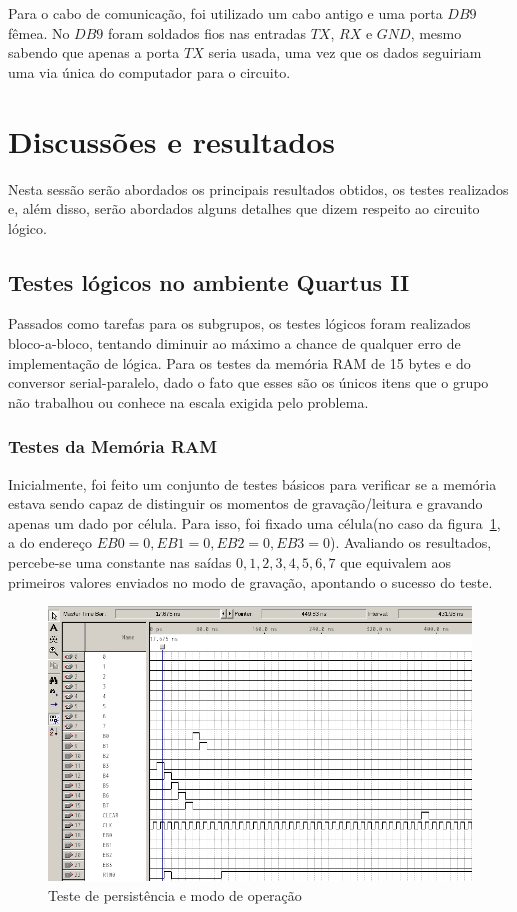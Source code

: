 \documentclass[12pt]{article}
\begin{document}
Para o cabo de comunicação, foi utilizado um cabo antigo e uma porta $DB9$ fêmea. No $DB9$ foram soldados fios nas entradas $TX$, $RX$ e $GND$, mesmo sabendo que apenas a porta $TX$ seria usada, uma vez que os dados seguiriam uma via única do computador para o circuito.

\section{Discussões e resultados}

Nesta sessão serão abordados os principais resultados obtidos, os testes realizados e, além disso, serão abordados alguns detalhes que dizem respeito ao circuito lógico.

\subsection{Testes lógicos no ambiente Quartus II}

Passados como tarefas para os subgrupos, os testes lógicos foram realizados bloco-a-bloco, tentando diminuir ao máximo a chance de qualquer erro de implementação de lógica. Para os testes da memória RAM de 15 bytes e do conversor serial-paralelo, dado o fato que esses são os únicos itens que o grupo não trabalhou ou conhece na escala exigida pelo problema.

\subsubsection{Testes da Memória RAM}

Inicialmente, foi feito um conjunto de testes básicos para verificar se a memória estava sendo capaz de distinguir os momentos de gravação/leitura e gravando apenas um dado por célula. Para isso, foi fixado uma célula(no caso da figura~\ref{fig:ramtest}, a do endereço $EB0=0, EB1=0, EB2=0, EB3=0$). Avaliando os resultados, percebe-se uma constante nas saídas $0,1,2,3,4,5,6,7$ que equivalem aos primeiros valores enviados no modo de gravação, apontando o sucesso do teste.

\begin{figure}[!htbp]
\centering
\includegraphics[width=1\textwidth]{img/p4/testram1.png}
\caption{Teste de persistência e modo de operação}
\label{fig:ramtest}
\end{figure}
\end{document}
